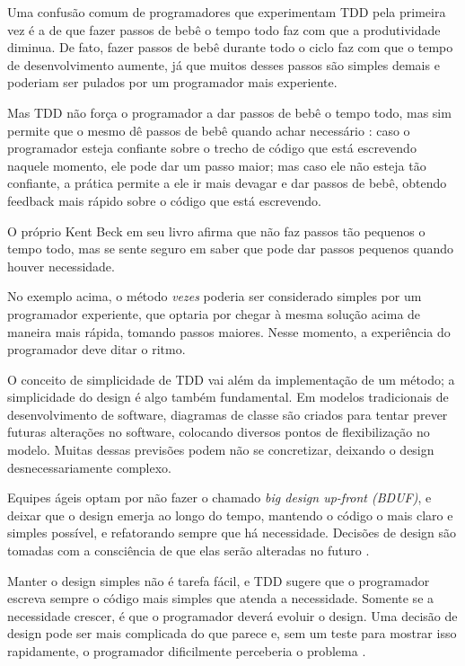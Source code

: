 Uma confusão comum de programadores que experimentam TDD pela primeira vez é a
de que fazer passos de bebê o tempo todo faz com que a produtividade diminua.
De fato, fazer passos de bebê durante todo o ciclo faz com que o tempo de
desenvolvimento aumente, já que muitos desses passos são simples demais e
poderiam ser pulados por um programador mais experiente. 

Mas TDD não força o programador a dar passos de bebê o tempo todo, mas sim
permite que o mesmo dê passos de bebê quando achar necessário
\cite{TDDByExample}: caso o programador esteja confiante sobre o trecho de
código  que está escrevendo naquele momento, ele pode dar um passo maior;  mas
caso ele não esteja tão confiante, a prática permite a ele ir mais devagar e 
dar passos de bebê, obtendo feedback mais rápido sobre o código que está
escrevendo.

O próprio Kent Beck em seu livro afirma que não faz passos tão pequenos o tempo
todo, mas se sente seguro em saber que pode dar passos pequenos quando houver
necessidade.

No exemplo acima, o método \textit{vezes} poderia ser considerado simples por
um programador experiente, que optaria por chegar à mesma solução acima de
maneira mais rápida, tomando passos maiores. Nesse momento, a experiência do
programador deve ditar o ritmo.

O conceito de simplicidade de TDD vai além da implementação de um método; a
simplicidade do design é algo também fundamental. Em modelos tradicionais de
desenvolvimento de software, diagramas de classe são criados para tentar prever
futuras alterações no software, colocando diversos pontos de flexibilização no
modelo. Muitas dessas previsões podem não se concretizar, deixando o design
desnecessariamente complexo.

Equipes ágeis optam por não fazer o chamado \textit{big design up-front (BDUF)},
e deixar que o design emerja ao longo do tempo, mantendo o código o mais claro e
simples possível, e refatorando sempre que há necessidade. Decisões de
design são tomadas com a consciência de que elas serão alteradas no futuro
\cite{is-design-dead}.

Manter o design simples não é tarefa fácil, e TDD sugere que o programador
escreva sempre o código mais simples que atenda a necessidade. Somente se a
necessidade crescer, é que o programador deverá evoluir o design. Uma decisão de
design pode ser mais complicada do que parece e, sem um teste para mostrar isso
rapidamente, o programador dificilmente perceberia o problema \cite{aim-fire}.

